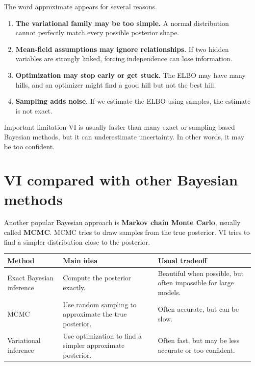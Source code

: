 \documentclass[11pt]{article}
\begin{document}
The word approximate appears for several reasons.

\begin{enumerate}[leftmargin=*]
  \item \textbf{The variational family may be too simple.} A normal distribution cannot perfectly match every possible posterior shape.
  \item \textbf{Mean-field assumptions may ignore relationships.} If two hidden variables are strongly linked, forcing independence can lose information.
  \item \textbf{Optimization may stop early or get stuck.} The ELBO may have many hills, and an optimizer might find a good hill but not the best hill.
  \item \textbf{Sampling adds noise.} If we estimate the ELBO using samples, the estimate is not exact.
\end{enumerate}

\begin{warningbox}{Important limitation}
VI is usually faster than many exact or sampling-based Bayesian methods, but it can underestimate uncertainty. In other words, it may be too confident.
\end{warningbox}

\section{VI compared with other Bayesian methods}

Another popular Bayesian approach is \textbf{Markov chain Monte Carlo}, usually called \textbf{MCMC}.
MCMC tries to draw samples from the true posterior. VI tries to find a simpler distribution close to the posterior.

\begin{center}
\renewcommand{\arraystretch}{1.25}
\begin{tabular}{>{\raggedright\arraybackslash}p{} >{\raggedright\arraybackslash}p{} >{\raggedright\arraybackslash}p{}}
\toprule
Method & Main idea & Usual tradeoff \\
\midrule
Exact Bayesian inference & Compute the posterior exactly. & Beautiful when possible, but often impossible for large models. \\
MCMC & Use random sampling to approximate the true posterior. & Often accurate, but can be slow. \\
Variational inference & Use optimization to find a simpler approximate posterior. & Often fast, but may be less accurate or too confident. \\
\bottomrule
\end{tabular}
\end{center}
\end{document}
